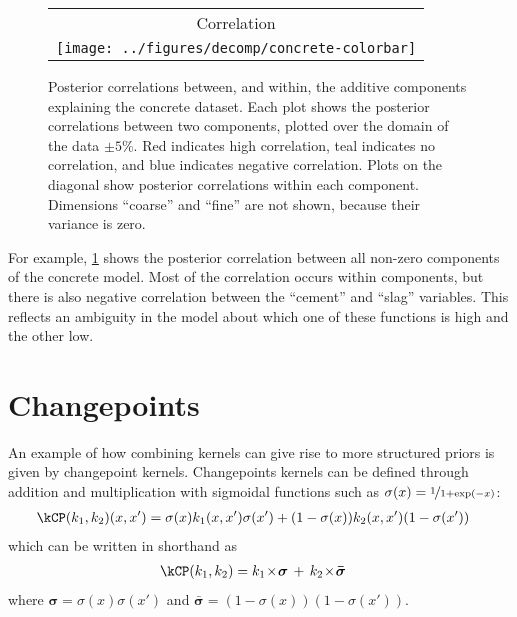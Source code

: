 \begin{figure}
{\begin{tabular}{c}
 Correlation \\[1ex]
\texttt{[image: ../figures/decomp/concrete-colorbar]}
\end{tabular}
}
\caption[Visualizing posterior correlations between components]
{Posterior correlations between, and within, the additive components explaining the concrete dataset.
Each plot shows the posterior correlations between two components, plotted over the domain of the data $\pm 5\%$.
Red indicates high correlation, teal indicates no correlation, and blue indicates negative correlation.
Plots on the diagonal show posterior correlations within each component.
Dimensions ``coarse'' and ``fine'' are not shown, because their variance is zero.
}
\label{fig:interpretable interactions}
\end{figure}
%
For example, \cref{fig:interpretable interactions} shows the posterior correlation between all non-zero components of the concrete model.
Most of the correlation occurs within components, but there is also negative correlation between the ``cement'' and ``slag'' variables.
This reflects an ambiguity in the model about which one of these functions is high and the other low.






\section{Changepoints}
\label{sec:changepoint-definition}
An example of how combining kernels can give rise to more structured priors is given by changepoint kernels.
Changepoints kernels can be defined through addition and multiplication with sigmoidal functions such as $\sigma(x) = \nicefrac{1}{1 + \exp(-x)}$:
%
\begin{align}
\kCP(\kernel_1, \kernel_2)(x,x') & = \sigma(x) k_1(x,x')\sigma(x') + (1-\sigma(x)) k_2(x,x')(1-\sigma(x'))
\label{eq:cp}
\end{align}
%
which can be written in shorthand as
%
\begin{align}
\kCP(\kernel_1, \kernel_2)& = \kernel_1 \kerntimes \boldsymbol\sigma \kernplus \kernel_2 \kerntimes \boldsymbol{\bar\sigma}
\end{align}
where $\boldsymbol\sigma = \sigma(x)\sigma(x')$ and $\boldsymbol{\bar\sigma} = (1-\sigma(x))(1-\sigma(x'))$.

